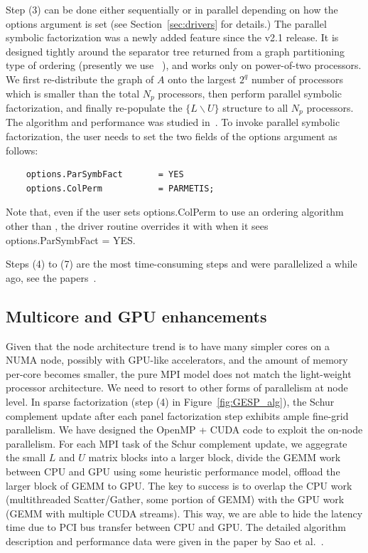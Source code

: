 Step (3) can be done either sequentially or in parallel
depending on how the \textsf{options} argument is set
(see Section~\ref{sec:drivers} for details.)
The parallel symbolic factorization was a newly added feature
since the \textsf{v2.1} release. 
It is designed tightly around the separator tree returned from
a graph partitioning type of ordering (presently we use
{\parmetis}~\cite{kaku:03}), and works only on power-of-two
processors.  We first re-distribute the graph of $A$
onto the largest $2^q$ number of processors
which is smaller than the total $N_p$ processors, then perform
parallel symbolic factorization, and finally re-populate the
$\{L \backslash U\}$ structure to all $N_p$ processors.
The algorithm and performance was studied in~\cite{grigoridemmelli07}.
To invoke parallel symbolic factorization, the user needs to set
the two fields of the \textsf{options} argument as follows:
\begin{verbatim}
    options.ParSymbFact       = YES
    options.ColPerm           = PARMETIS;
\end{verbatim}
Note that, even if the user sets \textsf{options.ColPerm} to use an ordering
algorithm other than {\parmetis}, the driver routine overrides it with
{\parmetis} when it sees \textsf{options.ParSymbFact = YES}.

Steps (4) to (7) are the most time-consuming steps and were parallelized
a while ago, see the papers~\cite{lidemmel03,li05}.


\subsection{Multicore and GPU enhancements}
Given that the node architecture trend is to have many simpler cores
on a NUMA node, possibly with GPU-like accelerators, and the
amount of memory per-core becomes smaller, the pure MPI model
does not match the light-weight processor architecture.
We need to resort to other forms of parallelism
at node level. In sparse factorization (step (4) in Figure~\ref{fig:GESP_alg}),
the Schur complement update after each panel factorization step exhibits
ample fine-grid parallelism. We have designed the OpenMP + CUDA
code to exploit the on-node parallelism. For each MPI task of the 
Schur complement update, we aggegrate the small $L$ and $U$ matrix blocks
into a larger block, divide the GEMM work between CPU and GPU using
some heuristic performance model, offload the larger block of GEMM
to GPU.  The key to success is to overlap the CPU work 
(multithreaded Scatter/Gather, some portion of GEMM) with
the GPU work (GEMM with multiple CUDA streams). This way, we are able
to hide the latency time due to PCI bus transfer between CPU and GPU.
The detailed algorithm description and performance data were given
in the paper by Sao et al.~\cite{sao2014}.

